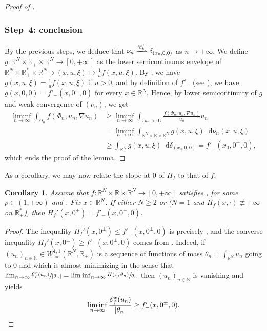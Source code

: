 \documentclass[JEP,XML,SOM,Unicode,published]{cedram}
\theoremstyle{plain}
\newtheorem{corollary}[theorem]{Corollary}
\theoremstyle{definition}
\newcommand{\dd}{\mathop{}\mathopen{}\mathrm{d}}
\newcommand{\N}{\mathbb{N}}
\newcommand{\R}{\mathbb{R}}
\newcommand{\Cspace}{\mathscr{C}}
\newcommand{\ener}{\mathcal{E}}
\newcommand{\loc}{\mathrm{loc}}
\DeclarePairedDelimiter{\abs}{\lvert}{\rvert}
\newcommand{\narrowto}{\xrightharpoonup{\Cspace_b'}}
\begin{document}
\begin{proof}[Proof of ]
\subsubsection*{Step~4: conclusion} By the previous steps, we deduce that $\nu_n \narrowto \delta_{(x_0,0,0)}$ as $n\to+\infty$. We define $g : \R^N \times \R_+ \times \R^N \to [0,+\infty]$ as the lower semicontinuous envelope of $\R^N \times \R_+^* \times \R^N \ni (x,u,\xi) \mapsto \frac 1u f(x,u,\xi)$. By , we have \(g(x,u,\xi)=\frac 1u f(x,u,\xi)\) if \(u>0\), and by definition of $f'_-$ (see ), we have \(g(x,0,0)=f'_-(x,0^+,0)\) for every \(x\in\R^N\). Hence, by lower semicontinuity of $g$ and weak convergence of $(\nu_n)$, we get
\begin{align*}
\liminf_{n\to\infty} \int_{\Omega_n} f(\Phi_n,u_n,\nabla u_n) &\geq \liminf_{n\to\infty} \int_{\{u_n>0\}} \frac{f(\Phi_n,u_n,\nabla u_n)}{u_n} u_n\\
&= \liminf_{n\to\infty} \int_{\R^N \times \R \times \R^N} g(x,u,\xi) \dd \nu_n(x,u,\xi)\\
&\geq \int_{\R^N} g(x,u,\xi) \dd \delta_{(x_0,0,0)}=f'_-(x_0,0^+,0),
\end{align*}
which ends the proof of the lemma.
\end{proof}

As a corollary, we may now relate the slope at $0$ of $H_f$ to that of $f$.

\begin{corollary}
Assume that $f : \R^N \times \R \times \R^N \to [0,+\infty]$ satisfies ,  for some \(p\in(1,+\infty)\) and . Fix $x\in \R^N$. If either $N \geq 2$ or ($N=1$ and $H_f(x,\cdot)\not\equiv +\infty$ on $\R_\pm^\ast$), then $H_f'(x,0^\pm) = f'_-(x,0^\pm,0)$.
\end{corollary}
\begin{proof}
The inequality $H_f'(x,0^\pm) \leq f'_-(x,0^\pm,0)$ is precisely , and the converse inequality $H_f'(x,0^\pm) \geq f'_-(x,0^\pm,0)$ comes from . Indeed, if $(u_n)_{n\in\N} \in W^{1,1}_\loc(\R^N,\R_\pm)$ is a sequence of functions of mass $\theta_n = \int_{\R^N} u_n$ going to $0$ and which is almost minimizing in the sense that $\lim_{n\to\infty} \sfrac{\ener^x_f(u_n)}{\abs{\theta_n}} = \liminf_{n\to\infty} \sfrac{H(x,\theta_n)}{\theta_n}$ then $(u_n)_{n\in\N}$ is vanishing and  yields
\[\liminf_{n\to\infty} \frac{\ener^x_f(u_n)}{\abs{\theta_n}} \geq f'_-(x,0^\pm,0).\qedhere\]
\end{proof}
\end{document}

